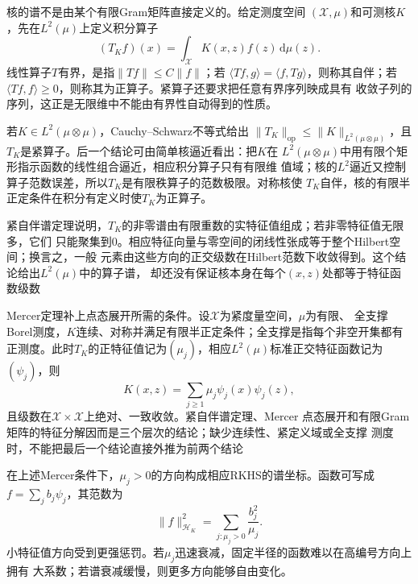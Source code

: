 核的谱不是由某个有限Gram矩阵直接定义的。给定测度空间
$(\mathcal{X},\mu)$和可测核$K$，先在$L^2(\mu)$上定义积分算子
\begin{equation}
  (T_Kf)(x)
  =
  \int_{\mathcal{X}}K(x,z)f(z)\,\mathrm{d}\mu(z).
  \label{eq:functional-kernel-integral-operator}
\end{equation}
线性算子$T$有界，是指$\lVert Tf\rVert\leq C\lVert f\rVert$；若
$\langle Tf,g\rangle=\langle f,Tg\rangle$，则称其自伴；若
$\langle Tf,f\rangle\geq0$，则称其为正算子。紧算子还要求把任意有界序列映成具有
收敛子列的序列，这正是无限维中不能由有界性自动得到的性质。

若$K\in L^2(\mu\otimes\mu)$，Cauchy--Schwarz不等式给出
$\lVert T_K\rVert_{\mathrm{op}}\leq\lVert K\rVert_{L^2(\mu\otimes\mu)}$，且
$T_K$是紧算子。后一个结论可由简单核逼近看出：把$K$在
$L^2(\mu\otimes\mu)$中用有限个矩形指示函数的线性组合逼近，相应积分算子只有有限维
值域；核的$L^2$逼近又控制算子范数误差，所以$T_K$是有限秩算子的范数极限。对称核使
$T_K$自伴，核的有限半正定条件在积分有定义时使$T_K$为正算子。

紧自伴谱定理说明，$T_K$的非零谱由有限重数的实特征值组成；若非零特征值无限多，它们
只能聚集到$0$。相应特征向量与零空间的闭线性张成等于整个Hilbert空间；换言之，一般
元素由这些方向的正交级数在Hilbert范数下收敛得到。这个结论给出$L^2(\mu)$中的算子谱，
却还没有保证核本身在每个$(x,z)$处都等于特征函数级数

Mercer定理补上点态展开所需的条件。设$\mathcal{X}$为紧度量空间，$\mu$为有限、
全支撑Borel测度，$K$连续、对称并满足有限半正定条件；全支撑是指每个非空开集都有
正测度。此时$T_K$的正特征值记为$(\mu_j)$，相应$L^2(\mu)$标准正交特征函数记为
$(\psi_j)$，则
\[
  K(x,z)
  =
  \sum_{j\geq1}\mu_j\psi_j(x)\psi_j(z),
\]
且级数在$\mathcal{X}\times\mathcal{X}$上绝对、一致收敛。紧自伴谱定理、Mercer
点态展开和有限Gram矩阵的特征分解因而是三个层次的结论；缺少连续性、紧定义域或全支撑
测度时，不能把最后一个结论直接外推为前两个结论

在上述Mercer条件下，$\mu_j>0$的方向构成相应RKHS的谱坐标。函数可写成
$f=\sum_jb_j\psi_j$，其范数为
\begin{equation}
  \lVert f\rVert_{\mathcal{H}_K}^2
  =
  \sum_{j:\mu_j>0}\frac{b_j^2}{\mu_j}.
  \label{eq:functional-rkhs-spectral-norm}
\end{equation}
小特征值方向受到更强惩罚。若$\mu_j$迅速衰减，固定半径的函数难以在高编号方向上拥有
大系数；若谱衰减缓慢，则更多方向能够自由变化。

